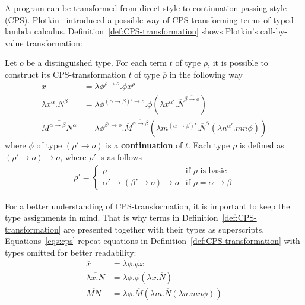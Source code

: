 A program can be transformed from direct style to continuation-passing style (CPS).
Plotkin~\cite{Plotkin:1975:Call-by-Name-Call-by-Value-and-the-lambda-Calculus} introduced a possible way of CPS-transforming terms of typed lambda calculus. Definition~\ref{def:CPS-transformation} shows Plotkin's call-by-value transformation: 
\begin{definition}\label{def:CPS-transformation} Let $o$ be a distinguished type. For each term $t$ of type $\rho$, it is possible to construct its CPS-transformation $\overline{t}$ of type $\overline{\rho}$ in the following way
%
\begin{align*}
\overline{x} & = \lambda \phi^{\rho \rightarrow o}. \phi x^{\rho}  \\
\overline{\lambda x^{\alpha}.N^{\beta}} & = \lambda \phi^{(\alpha \rightarrow \beta)' \rightarrow o}. \phi  (\lambda x^{\alpha'}. \overline{N}^{\overline{\beta \rightarrow o}}) \\
\overline{M^{\alpha \rightarrow \beta}N^\alpha} & = \lambda \phi^{\beta' \rightarrow o}. \overline{M}^{\overline{\alpha \rightarrow \beta} }(\lambda m^{(\alpha \rightarrow \beta)'}. \overline{N}^{\overline{\alpha}}(\lambda n^{\alpha'}.mn \phi)) 
\end{align*}
%
where $\phi$ of type $(\rho' \rightarrow o)$ is a \textbf{continuation} of $t$. Each type  $\overline{\rho}$ is defined as $(\rho' \rightarrow o) \rightarrow o$, where $\rho'$ is as follows
%
\begin{align*}
\rho' = \left\{
\begin{array}{rl} 
\rho & \text{if } \rho \text{ is basic}\\
{\alpha'} \rightarrow ({\beta}' \rightarrow o) \rightarrow o & \text{if } \rho = \alpha \rightarrow \beta \end{array} \right.
\end{align*}
\end{definition}

For a better understanding of CPS-transformation, it is important to keep the type assignments in mind. That is why terms in Definition~\ref{def:CPS-transformation} are presented together with their types as superscripts. Equations~\eqref{eqs:cps} repeat equations in Definition~\ref{def:CPS-transformation} with types omitted for better readability:
%
\begin{subequations}
\begin{align}
\overline{x} & = \lambda \phi. \phi x \label{eq:var}  \\
\overline{\lambda x.N} & = \lambda \phi. \phi (\lambda x. \overline{N}) \label{eq:abst}\\
\overline{MN} & = \lambda \phi. \overline{M}(\lambda m. \overline{N}(\lambda n.mn \phi)) \label{eq:app}
\end{align} \label{eqs:cps}
\end{subequations}

